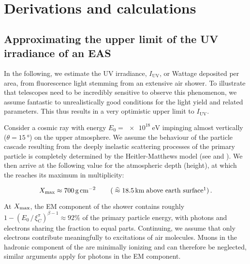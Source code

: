 
\chapter{Derivations and calculations}
\label{app:derivation}


\section{Approximating the upper limit of the UV irradiance of an EAS}
\label{app:cr-uv-irradiance}

In the following, we estimate the UV irradiance, $I_\text{UV}$, or Wattage 
deposited per area, from fluorescence light stemming from an extensive air 
shower. To illustrate that telescopes need to be incredibly sensitive to 
observe this phenomenon, we assume fantastic to unrealistically good conditions
for the \UV light yield and related parameters. This thus results in a very 
optimistic upper limit to $I_\text{UV}$.

Consider a cosmic ray with energy $E_0 = \SI{e18}{\eV}$ impinging almost 
vertically ($\theta=\SI{15}{\degree}$) on the upper 
atmosphere. We assume the behaviour of the particle cascade resulting from the 
deeply inelastic scattering processes of the primary particle is completely 
determined by the Heitler-Matthews model (see  and 
\cite{Matthews2005, Risse2006}). We then arrive at the following value for the 
atmospheric depth (height), at which the \EAS reaches its maximum in 
multiplicity:

\begin{equation}
\label{eq:irradiance-multiplicity}
\Xmax \approx \SI{700}{\gram\per\centi\meter\squared}\qquad\left(\;\widehat{\approx}\;\SI{18.5}{\kilo\meter}\;\text{above earth surface}\footnotemark\right).
\end{equation}

At $X_\mathrm{max}$, the EM component of the shower contains roughly
$1-\left(E_0\,/\,\xi^\pi_C\right)^{\beta-1}\approx92\%$ of the primary particle 
energy, with photons and electrons sharing the fraction to equal parts.
Continuing, we assume that only electrons contribute meaningfully to excitations
of air molecules. Muons in the hadronic component of the \EAS are minimally 
ionizing and can therefore be neglected, similar arguments apply for photons in 
the EM component.

